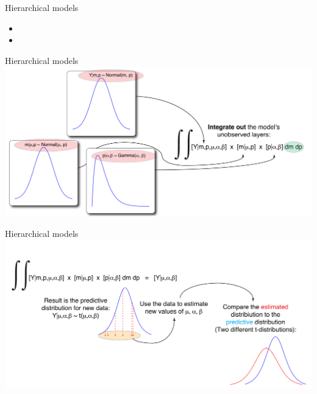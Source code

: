 \documentclass{beamer}
\begin{document}
\begin{frame}{Hierarchical models}
	\begin{itemize}
		\item {}
		\item {}
	\end{itemize}
\end{frame}


\begin{frame}{Hierarchical models}
	\includegraphics[width=\textwidth]{../../figures/hierarchical-integrate}
\end{frame}


\begin{frame}{Hierarchical models}
	\includegraphics[width=\textwidth]{../../figures/hierarchical-marginal}
\end{frame}
\end{document}
